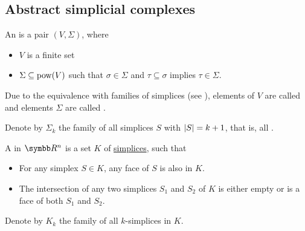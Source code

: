 \subsection{Abstract simplicial complexes}\label{subsec:abstract_simplicial_complexes}

\begin{definition}\label{def:abstract_simplicial_complex}\cite[definition 2.1]{Carlsson2009}
  An  is a pair \( (V, \Sigma) \), where
  \begin{itemize}
    \item \( V \) is a finite set
    \item \( \Sigma \subseteq \operatorname{pow}(V) \) such that \( \sigma \in \Sigma \) and \( \tau \subseteq \sigma \) implies \( \tau \in \Sigma \).
  \end{itemize}

  Due to the equivalence with families of simplices (see ), elements of \( V \) are called  and elements \( \Sigma \) are called .

  Denote by \( \Sigma_k \) the family of all simplices \( S \) with \( \left\vert S \right\vert = k + 1 \), that is, all .
\end{definition}

\begin{definition}\label{def:simplicial_complex}
  A  in \( \BR^n \) is a set \( K \) of \hyperref[def:simplex]{simplices}, such that
  \begin{itemize}
    \item For any simplex \( S \in K \), any face of \( S \) is also in \( K \).
    \item The intersection of any two simplices \( S_1 \) and \( S_2 \) of \( K \) is either empty or is a face of both \( S_1 \) and \( S_2 \).
  \end{itemize}

  Denote by \( K_k \) the family of all \( k \)-simplices in \( K \).
\end{definition}

